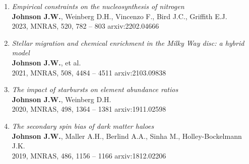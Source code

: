 \documentclass[cv.tex]{subfiles}
\begin{document}
\begin{enumerate}
	\item \textit{Empirical constraints on the nucleosynthesis of nitrogen}
	\\
	\textbf{Johnson J.W.}, Weinberg D.H., Vincenzo F., Bird J.C., Griffith E.J.
	\\
	2023, MNRAS, 520, 782 -- 803 \hfill arxiv:2202.04666

	\item \textit{Stellar migration and chemical enrichment in the Milky Way
	disc: a hybrid model}
	\\
	\textbf{Johnson J.W.}, et al.
	\\
	2021, MNRAS, 508, 4484 -- 4511 \hfill arxiv:2103.09838

	\item \textit{The impact of starbursts on element abundance ratios}
	\\
	\textbf{Johnson J.W.}, Weinberg D.H.
	\\
	2020, MNRAS, 498, 1364 -- 1381 \hfill arxiv:1911.02598

	\item \textit{The secondary spin bias of dark matter haloes}
	\\
	\textbf{Johnson J.W.}, Maller A.H., Berlind A.A., Sinha M.,
	Holley-Bockelmann J.K.
	\\
	2019, MNRAS, 486, 1156 -- 1166 \hfill arxiv:1812.02206

\end{enumerate}
\end{document}
